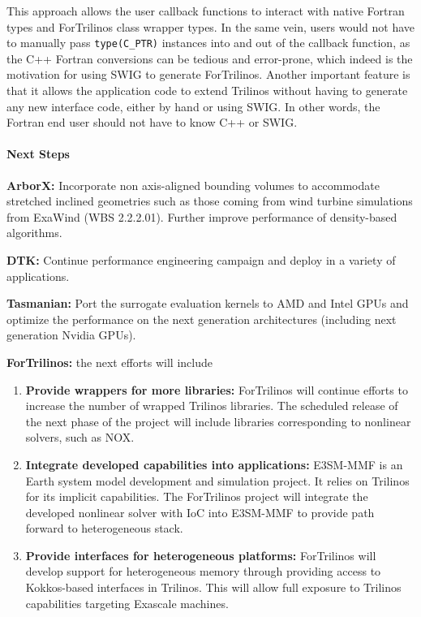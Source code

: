 This approach allows the user callback functions to interact with native Fortran
types and ForTrilinos class wrapper types. In the same vein, users would not
have to manually pass \texttt{type(C\_PTR)} instances into and out of the
callback function, as the C++ Fortran conversions can be tedious and
error-prone, which indeed is the motivation for using SWIG to generate
ForTrilinos.  Another important feature is that it allows the application code
to extend Trilinos without having to generate any new interface code, either by
hand or using SWIG. In other words, the Fortran end user should not have to know
C++ or SWIG.


\paragraph{Next Steps}

\indent

{\bf ArborX:} Incorporate non axis-aligned bounding volumes to accommodate
stretched inclined geometries such as those coming from wind turbine
simulations from ExaWind (WBS 2.2.2.01). Further improve performance of
density-based algorithms.

{\bf DTK:} Continue performance engineering campaign and deploy in a variety of
applications.

{\bf Tasmanian:} Port the surrogate evaluation kernels to AMD and Intel
GPUs and optimize the performance on the next generation architectures
(including next generation Nvidia GPUs).

{\bf ForTrilinos:} the next efforts will include
\begin{enumerate}
  \item \textbf{Provide wrappers for more libraries:} ForTrilinos will continue
    efforts to increase the number of wrapped Trilinos libraries. The scheduled
    release of the next phase of the project will include libraries
    corresponding to nonlinear solvers, such as NOX.
  \item \textbf{Integrate developed capabilities into applications:} E3SM-MMF
    is an Earth system model development and simulation project. It relies on
    Trilinos for its implicit capabilities. The ForTrilinos project will
    integrate the developed nonlinear solver with IoC into E3SM-MMF to provide
    path forward to heterogeneous stack.
  \item \textbf{Provide interfaces for heterogeneous platforms:} ForTrilinos
    will develop support for heterogeneous memory through providing access to
    Kokkos-based interfaces in Trilinos. This will allow full exposure to
    Trilinos capabilities targeting Exascale machines.
\end{enumerate}

